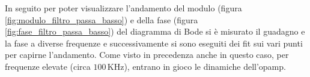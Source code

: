 \documentclass[a4paper,12pt]{article}
\begin{document}
In seguito per poter visualizzare l'andamento del modulo (figura \ref{fig:modulo_filtro_passa_basso}) e della fase (figura \ref{fig:fase_filtro_passa_basso}) del diagramma di Bode si è misurato il guadagno e la fase a diverse frequenze e successivamente si sono eseguiti dei fit sui vari punti per capirne l'andamento. Come visto in precedenza anche in questo caso, per frequenze elevate (circa $100\,\mathrm{KHz}$), entrano in gioco le dinamiche dell'opamp.
\end{document}
